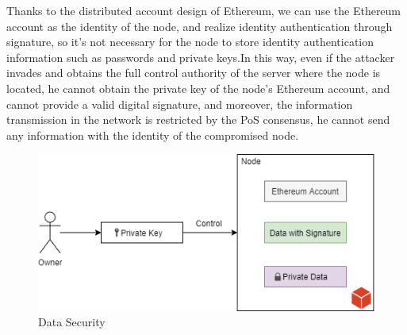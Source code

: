 \documentclass{article}
\begin{document}
    Thanks to the distributed account design of Ethereum, we can use the Ethereum account as the identity of the node, and realize identity authentication through signature, so it's not necessary for the node to store identity authentication information such as passwords and private keys.In this way, even if the attacker invades and obtains the full control authority of the server where the node is located, he cannot obtain the private key of the node's Ethereum account, and cannot provide a valid digital signature, and moreover, the information transmission in the network is restricted by the PoS consensus, he cannot send any information with the identity of the compromised node.

    \begin{figure}[H]
        \centering
        \includegraphics[scale=0.6]{figures-data_security.png}
        \caption{Data Security}
    \end{figure}
\end{document}
